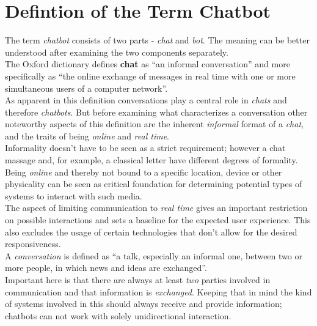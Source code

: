 \section{Defintion of the Term Chatbot} \label{defchatbot}


The term \emph{chatbot} consists of two parts - \emph{chat} and \emph{bot}. The meaning can be better understood after examining the two components separately.
\\

The Oxford dictionary defines \textbf{chat} as ``an informal conversation'' and more specifically as ``the online exchange of messages in real time with one or more simultaneous users of a computer network''\cite{oxfordchat}.
\\
As apparent in this definition conversations play a central role in \emph{chats} and therefore \emph{chatbots}. But before examining what characterizes a conversation other noteworthy aspects of this definition are the inherent \emph{informal} format of a \emph{chat}, and the traits of being \emph{online} and \emph{real time}.
\\
Informality doesn't have to be seen as a strict requirement; however a chat massage and, for example, a classical letter have different degrees of formality.
\\
Being \emph{online} and thereby not bound to a specific location, device or other physicality can be seen as critical foundation for determining potential types of systems to interact with such media.
\\
The aspect of limiting communication to \emph{real time} gives an important restriction on possible interactions and sets a baseline for the expected user experience. This also excludes the usage of certain technologies that don't allow for the desired responsiveness.
\\
A \emph{conversation} is defined as ``a talk, especially an informal one, between two or more people, in which news and ideas are exchanged''\cite{oxfordconversation}.
\\
Important here is that there are always at least \emph{two} parties involved in communication and that information is \emph{exchanged}. Keeping that in mind the kind of systems involved in this should always receive and provide information; chatbots can not work with solely unidirectional interaction.
\\


